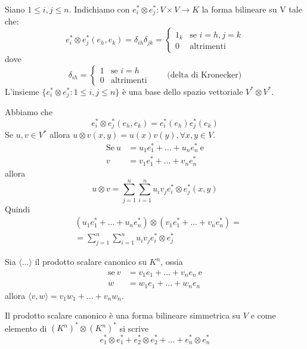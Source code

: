 \documentclass[../main.tex]{subfiles}
\begin{document}
Siano $1 \leq i,j \leq n$. Indichiamo con $e_i^* \otimes e_j^* : V \times V \rightarrow K$ la forma bilineare su V tale che:
\begin{equation*}
    e_i^* \otimes e_j^*(e_h, e_k) = \delta_{ih} \delta_{jk} = \begin{cases}
        1_k & \text{se } i = h, j = k \\
        0   & \text{altrimenti}
    \end{cases}
\end{equation*}
dove
\begin{equation*}
    \delta_{ih} = \begin{cases}
        1 & \text{se } i = h  \\
        0 & \text{altrimenti}
    \end{cases} \qquad \text{(delta di Kronecker)}
\end{equation*}
L'insieme $\{e_i^* \otimes e_j^* : 1 \leq i,j \leq n\}$ è una base dello spazio vettoriale $V^* \otimes V^*$.

Abbiamo che
\begin{equation*}
    e_i^* \otimes e_j^* (e_h, e_k) = e_i^*(e_h) e_j^*(e_k)
\end{equation*}
Se $u, v \in V^*$ allora $u \otimes v (x, y) = u(x) v(y), \forall x,y \in V $.
\begin{align*}
    \text{Se} \: u & = u_1e_1^* + \ldots + u_n e_n^* \: \text{e} \\ v &= v_1 e_1^* + \ldots + v_n e_n^*
\end{align*}
allora
\begin{equation*}
    u \otimes v = \sum_{j = 1}^{n} \sum_{i = 1}^{n} u_i v_j e_i^* \otimes e_j^*(x,y)
\end{equation*}
Quindi
\begin{align*}
     & (u_1e_1^* + \ldots + u_n e_n^*) \otimes (v_1 e_1^* + \ldots + v_n e_n^*) = \\
     & = \sum_{j = 1}^{n} \sum_{i = 1}^{n} u_i v_j e_i^* \otimes e_j^*
\end{align*}

\begin{example}
    Sia $\langle \ldots \rangle$ il prodotto scalare canonico su $K^n$, ossia
    \begin{align*}
        \text{se} \: v & = v_1 e_1 + \ldots + v_n e_n \: \text{e} \\ w &= w_1 e_1 + \ldots + w_n e_n
    \end{align*}
    allora $\langle v, w \rangle= v_1 w_1 + \ldots + v_n w_n$.

    Il prodotto scalare canonico è una forma bilineare simmetrica su $V$ e come elemento di $(K^n)^* \otimes (K^n)^*$ si scrive
    \begin{equation*}
        e_1^* \otimes e_1^* + e_2^* \otimes e_2^* + \ldots + e_n^* \otimes e_n^*
    \end{equation*}
\end{example}
\end{document}
